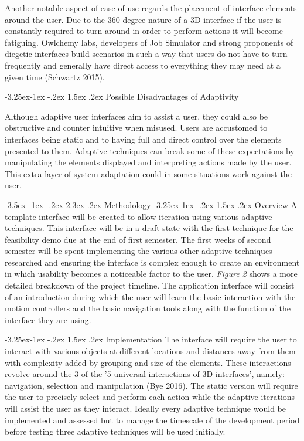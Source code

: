 \documentclass[12pt]{article}
\makeatletter
\renewcommand{\section}{\@startsection {section}{1}{\z@}%
             {-3.5ex \@plus -1ex \@minus -.2ex}%
             {2.3ex \@plus .2ex}%
             {\normalfont\Large\scshape\bfseries}}
\renewcommand{\subsection}{\@startsection{subsection}{2}{\z@}%
             {-3.25ex\@plus -1ex \@minus -.2ex}%
             {1.5ex \@plus .2ex}%
             {\normalfont\large\scshape\bfseries}}
\makeatother
\begin{document}
Another notable aspect of ease-of-use regards the placement of interface elements around the user. Due to the 360 degree nature of a 3D interface if the user is constantly required to turn around in order to perform actions it will become fatiguing. Owlchemy labs, developers of Job Simulator and strong proponents of diegetic interfaces build scenarios in such a way that users do not have to turn frequently and generally have direct access to everything they may need at a given time (Schwartz 2015).

\subsection{Possible Disadvantages of Adaptivity}

Although adaptive user interfaces aim to assist a user, they could also be obstructive and counter intuitive when misused. Users are accustomed to interfaces being static and to having full and direct control over the elements presented to them. Adaptive techniques can break some of these expectations by manipulating the elements displayed and interpreting actions made by the user. This extra layer of system adaptation could in some situations work against the user.

\section{Methodology}
\subsection{Overview}
A template interface will be created to allow iteration using various adaptive techniques. This interface will be in a draft state with the first technique for the feasibility demo due at the end of first semester. The first weeks of second semester will be spent implementing the various other adaptive techniques researched and ensuring the interface is complex enough to create an environment in which usability becomes a noticeable factor to the user. \emph{Figure 2} shows a more detailed breakdown of the project timeline. The application interface will consist of an introduction during which the user will learn the basic interaction with the motion controllers and the basic navigation tools along with the function of the interface they are using.

\subsection{Implementation}
The interface will require the user to interact with various objects at different locations and distances away from them with complexity added by grouping and size of the elements. These interactions revolve around the 3 of the '5 universal interactions of 3D interfaces', namely: navigation, selection and manipulation (Bye 2016). The static version will require the user to precisely select and perform each action while the adaptive iterations will assist the user as they interact. Ideally every adaptive technique would be implemented and assessed but to manage the timescale of the development period before testing three adaptive techniques will be used initially.
\end{document}

